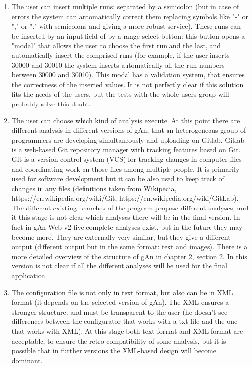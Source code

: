 \begin{enumerate}

\item The user can insert multiple runs: separated by a semicolon (but in case of errors the system can automatically correct them replacing symbols like "-" or "," or "." with semicolons and giving a more robust service). These runs can be inserted by an input field of by a range select button: this button opens a "modal" that allows the user to choose the first run and the last, and automatically insert the comprised runs (for example, if the user inserts 30000 and 30010 the system inserts automatically all the run numbers between 30000 and 30010). This modal has a validation system, that ensures the correctness of the inserted values. It is not perfectly clear if this solution fits the needs of the users, but the tests with the whole users group will probably solve this doubt. 

\item The user can choose which kind of analysis execute. At this point there are different analysis in different versions of gAn, that an heterogeneous group of programmers are developing simultaneously and uploading on Gitlab. Gitlab is a web-based Git repository manager with tracking features based on Git. Git is a version control system (VCS) for tracking changes in computer files and coordinating work on those files among multiple people. It is primarily used for software development but it can be also used to keep track of changes in any files (definitions taken from Wikipedia, https://en.wikipedia.org/wiki/Git, https://en.wikipedia.org/wiki/GitLab). The different existing branches of the program propose different analyses, and it this stage is not clear which analyses there will be in the final version. In fact in gAn Web v2 five complete analyses exist, but in the future they may become more. They are externally very similar, but they give a different output (different output but in the same format: text and images). There is a more detailed overview of the structure of gAn in chapter 2, section 2. 
In this version is not clear if all the different analyses will be used for the final application. 

\item The configuration file is not only in text format, but also can be in XML format (it depends on the selected version of gAn). The XML ensures a stronger structure, and must be transparent to the user (he doesn't see differences between the configurator that works with a txt file and the one that works with XML). At this stage both text format and XML format are acceptable, to ensure the retro-compatibility of some analysis, but it is possible that in further versions the XML-based design will become dominant. 


\end{enumerate}
